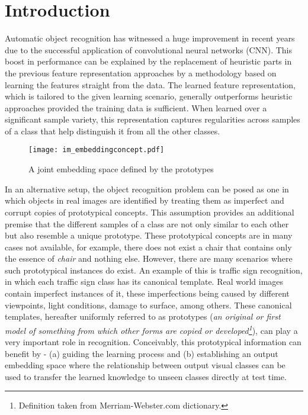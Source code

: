 \documentclass{bmvc2k}
\begin{document}
\section{Introduction}

Automatic object recognition has witnessed a huge improvement in recent years due to the successful 
application of convolutional neural networks (CNN). This boost in performance can be explained by 
the replacement of heuristic parts in the previous feature representation approaches by a methodology 
\cite{Lee/icml2009,Krizhevsky/nips2012} based on learning the features straight from the data. 
The learned feature representation, which is tailored to the given learning scenario, generally 
outperforms heuristic approaches provided the training data is sufficient.
When learned over a significant sample variety, this representation captures regularities across samples of a class 
that help distinguish it from all the other classes.      
\begin{figure}
\begin{center}
\texttt{[image: im\_embeddingconcept.pdf]}
\end{center}
\protect\caption{\label{fig:scheme} A joint embedding space defined by
the prototypes}
\end{figure}

In an alternative setup, the object recognition problem can be posed as one
in which objects in real images are identified by treating them as imperfect and corrupt copies 
of prototypical concepts. This assumption provides an additional premise that
the different samples of a class are not only similar to each other but also resemble a 
unique prototype. These prototypical concepts are in many cases not
available, for example, there does not exist a chair that contains only the
essence of \textit{chair} and nothing else.
However, there are many scenarios where such prototypical instances do exist. An example of this is traffic 
sign recognition, in which each traffic sign class has its canonical template. Real world images contain 
imperfect instances of it, these imperfections being caused by different viewpoints, light conditions, 
damage to surface, among others. These canonical templates, hereafter
uniformly referred to as prototypes (\textit{an original or first model of
something from which other forms are copied or developed\footnote{Definition taken from Merriam-Webster.com dictionary.%
}}), can play a very important role in recognition.
Conceivably, this prototypical information can benefit by - (a) guiding the learning process and 
(b) establishing an output embedding space where the relationship between
output visual classes can be used to transfer the learned knowledge to unseen
classes directly at test time.
\end{document}
